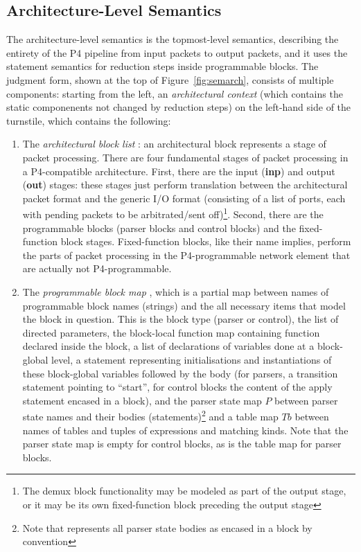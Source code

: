 \documentclass[UTF8]{article}
\begin{document}
\subsection{Architecture-Level Semantics}
The architecture-level semantics is the topmost-level semantics, describing the entirety of the P4 pipeline from input packets to output packets, and it uses the statement semantics for reduction steps inside programmable blocks. The judgment form, shown at the top of Figure~\ref{fig:semarch}, consists of multiple components: starting from the left, an \emph{architectural context} \actx{} (which contains the static componenents not changed by reduction steps) on the left-hand side of the turnstile, which contains the following:
\begin{enumerate}
\item The \emph{architectural block list} \abl{}: an architectural block represents a stage of packet processing. There are four fundamental stages of packet processing in a P4-compatible architecture. First, there are the input (\textbf{inp}) and output (\textbf{out}) stages: these stages just perform translation between the architectural packet format and the generic I/O format (consisting of a list of ports, each with pending packets to be arbitrated/sent off)\footnote{The demux block functionality may be modeled as part of the output stage, or it may be its own fixed-function block preceding the output stage}. Second, there are the programmable blocks (parser blocks and control blocks) and the fixed-function block stages. Fixed-function blocks, like their name implies, perform the parts of packet processing in the P4-programmable network element that are actually not P4-programmable.
\item The \emph{programmable block map} \pbm{}, which is a partial map between names of programmable block names (strings) and the all necessary items that model the block in question. This is the block type (parser or control), the list of directed parameters, the block-local function map containing function declared inside the block, a list of declarations of variables done at a block-global level, a statement representing initialisations and instantiations of these block-global variables followed by the body (for parsers, a transition statement pointing to ``start'', for control blocks the content of the apply statement encased in a block), and the parser state map $P$ between parser state names and their bodies (statements)\footnote{Note that \pfott{} represents all parser state bodies as encased in a block by convention} and a table map $\mathit{Tb}$ between names of tables and tuples of expressions and matching kinds. Note that the parser state map is empty for control blocks, as is the table map for parser blocks.

\end{enumerate}
\end{document}

